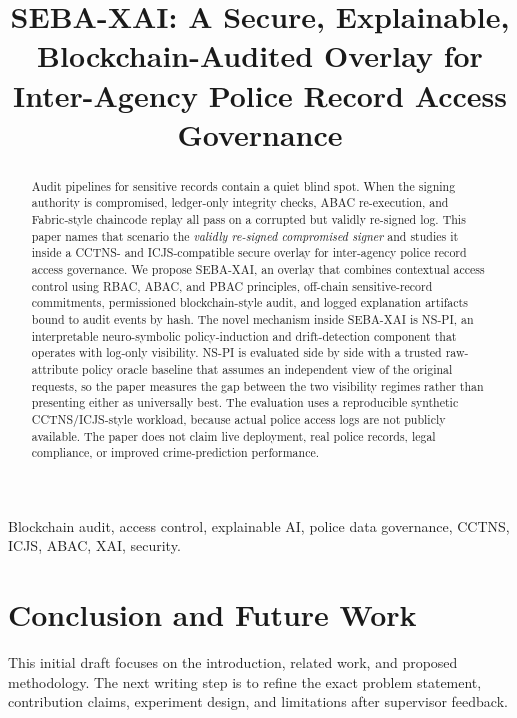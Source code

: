 \documentclass[conference]{IEEEtran}
\begin{document}
\title{SEBA-XAI: A Secure, Explainable, Blockchain-Audited Overlay for Inter-Agency Police Record Access Governance}

\author{
}

\maketitle

\begin{abstract}
Audit pipelines for sensitive records contain a quiet blind spot. When
the signing authority is compromised, ledger-only integrity checks,
ABAC re-execution, and Fabric-style chaincode replay all pass on a
corrupted but validly re-signed log. This paper names that scenario the
\emph{validly re-signed compromised signer} and studies it inside a
CCTNS- and ICJS-compatible secure overlay for inter-agency police
record access governance. We propose SEBA-XAI, an overlay that combines
contextual access control using RBAC, ABAC, and PBAC principles,
off-chain sensitive-record commitments, permissioned blockchain-style
audit, and logged explanation artifacts bound to audit events by hash.
The novel mechanism inside SEBA-XAI is NS-PI, an interpretable
neuro-symbolic policy-induction and drift-detection component that
operates with log-only visibility. NS-PI is evaluated side by side with
a trusted raw-attribute policy oracle baseline that assumes an
independent view of the original requests, so the paper measures the
gap between the two visibility regimes rather than presenting either as
universally best. The evaluation uses a reproducible synthetic
CCTNS/ICJS-style workload, because actual police access logs are not
publicly available. The paper does not claim live deployment, real
police records, legal compliance, or improved crime-prediction
performance.
\end{abstract}

\begin{IEEEkeywords}
Blockchain audit, access control, explainable AI, police data governance, CCTNS, ICJS, ABAC, XAI, security.
\end{IEEEkeywords}





\section{Conclusion and Future Work}
This initial draft focuses on the introduction, related work, and proposed methodology. The next writing step is to refine the exact problem statement, contribution claims, experiment design, and limitations after supervisor feedback.



\end{document}
